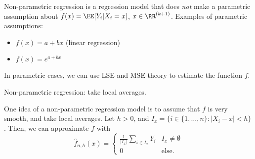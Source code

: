 Non-parametric regression is a regression model that does \textit{not} make a parametric assumption about $f(x) = \EE[Y_i | X_i = x]$, $x\in \RR^{(k+1)}$. Examples of parametric assumptions: 
\begin{itemize}
    \item $f(x) = a+bx$ (linear regression)
    \item $f(x) = e^{a+bx}$
\end{itemize}
In parametric cases, we can use LSE and MSE theory to estimate the function $f$. 

\begin{example}
\exlabel

Non-parametric regression: take local averages.
\end{example}
One idea of a non-parametric regression model is to assume that $f$ is very smooth, and take local averages. Let $h > 0$, and $I_x = \{i\in \{1,\hdots, n\} : \vert X_i-x\vert < h\}$. Then, we can approximate $f$ with 
\[\hat{f}_{n,h}(x) = \begin{cases}
\displaystyle\frac{1}{\vert I_x\vert}\sum_{i\in I_x}Y_i & I_x\neq \emptyset\\
0 & \text{else}.
\end{cases}\]